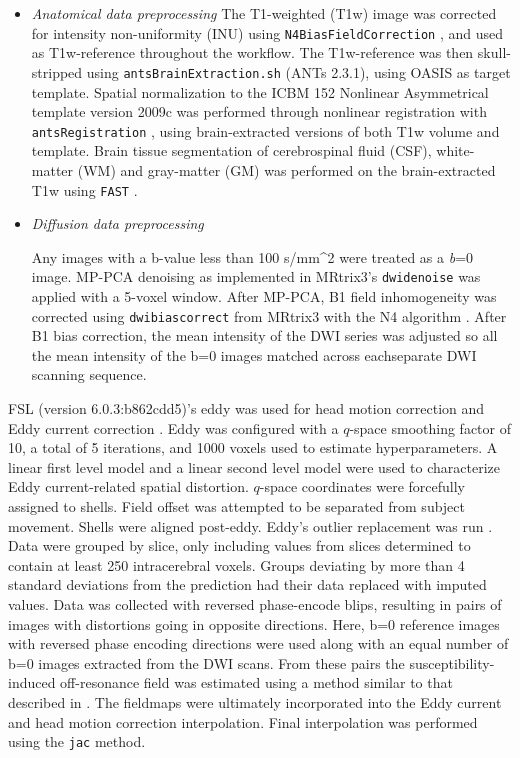 \documentclass[10pt,letterpaper]{article}
\begin{document}
\begin{enumerate}
\begin{itemize}

\item {\it Anatomical data preprocessing}
The T1-weighted (T1w) image was corrected for intensity non-uniformity
(INU) using \texttt{N4BiasFieldCorrection} \cite[ANTs 2.3.1]{n4}, and
used as T1w-reference throughout the workflow. The T1w-reference was
then skull-stripped using \texttt{antsBrainExtraction.sh} (ANTs 2.3.1),
using OASIS as target template. Spatial normalization to the ICBM 152
Nonlinear Asymmetrical template version 2009c
\cite[RRID:SCR\_008796]{mni} was performed through nonlinear
registration with \texttt{antsRegistration} \cite[ANTs 2.3.1,
RRID:SCR\_004757]{ants}, using brain-extracted versions of both T1w
volume and template. Brain tissue segmentation of cerebrospinal fluid
(CSF), white-matter (WM) and gray-matter (GM) was performed on the
brain-extracted T1w using \texttt{FAST} \cite[FSL 6.0.3:b862cdd5,
RRID:SCR\_002823]{fsl_fast}.

\item {\it Diffusion data preprocessing}

Any images with a b-value less than 100 s/mm\^{}2 were treated as a
\emph{b}=0 image. MP-PCA denoising as implemented in MRtrix3's
\texttt{dwidenoise}\cite{dwidenoise1} was applied with a 5-voxel
window. After MP-PCA, B1 field inhomogeneity was corrected using
\texttt{dwibiascorrect} from MRtrix3 with the N4 algorithm \cite{n4}.
After B1 bias correction, the mean intensity of the DWI series was
adjusted so all the mean intensity of the b=0 images matched across
eachseparate DWI scanning sequence.
\end{itemize}

FSL (version 6.0.3:b862cdd5)'s eddy was used for head motion correction
and Eddy current correction \cite{anderssoneddy}. Eddy was configured
with a \(q\)-space smoothing factor of 10, a total of 5 iterations, and
1000 voxels used to estimate hyperparameters. A linear first level model
and a linear second level model were used to characterize Eddy
current-related spatial distortion. \(q\)-space coordinates were
forcefully assigned to shells. Field offset was attempted to be
separated from subject movement. Shells were aligned post-eddy. Eddy's
outlier replacement was run \cite{eddyrepol}. Data were grouped by
slice, only including values from slices determined to contain at least
250 intracerebral voxels. Groups deviating by more than 4 standard
deviations from the prediction had their data replaced with imputed
values. Data was collected with reversed phase-encode blips, resulting
in pairs of images with distortions going in opposite directions. Here,
b=0 reference images with reversed phase encoding directions were used
along with an equal number of b=0 images extracted from the DWI scans.
From these pairs the susceptibility-induced off-resonance field was
estimated using a method similar to that described in \cite{topup}. The
fieldmaps were ultimately incorporated into the Eddy current and head
motion correction interpolation. Final interpolation was performed using
the \texttt{jac} method.


\end{enumerate}
\end{document}
